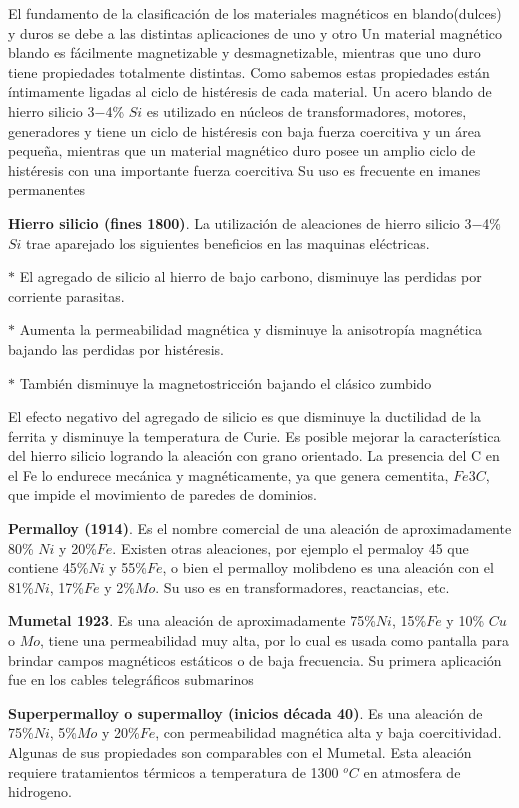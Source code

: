 El fundamento de la clasificación de los materiales magnéticos en blando(dulces) y duros se debe a las distintas aplicaciones de uno y otro Un material magnético blando es fácilmente magnetizable y desmagnetizable, mientras que uno duro tiene propiedades totalmente distintas. Como sabemos estas propiedades están íntimamente ligadas al ciclo de histéresis de cada material. Un acero blando de hierro silicio 3−4\% $Si$ es utilizado en núcleos de transformadores, motores, generadores y tiene un ciclo de histéresis con baja fuerza coercitiva y un área pequeña, mientras que un material magnético duro posee un amplio ciclo de histéresis con una importante fuerza coercitiva Su uso es frecuente en imanes permanentes

\textbf{Hierro silicio (fines 1800)}. La utilización de aleaciones de hierro silicio 3−4\% $Si$ trae aparejado los siguientes beneficios en las maquinas eléctricas.

$\ast$ El agregado de silicio al hierro de bajo carbono, disminuye las perdidas por corriente parasitas.

$\ast$ Aumenta la permeabilidad magnética y disminuye la anisotropía magnética bajando las perdidas por histéresis.

$\ast$ También disminuye la magnetostricción bajando el clásico zumbido 

El efecto negativo del agregado de silicio es que disminuye la ductilidad de la ferrita y disminuye la temperatura de Curie. Es posible mejorar la
característica del hierro silicio logrando la aleación con grano orientado. La presencia del C en el Fe lo endurece mecánica y magnéticamente, ya que
genera cementita, $Fe3C$, que impide el movimiento de paredes de dominios.

\textbf{Permalloy (1914)}. Es el nombre comercial de una aleación de aproximadamente 80\% $Ni$ y 20\%$Fe$. Existen otras aleaciones, por ejemplo el permaloy 45 que contiene 45\%$Ni$ y 55\%$Fe$, o bien el permalloy molibdeno es una aleación con el 81\%$Ni$, 17\%$Fe$ y 2\%$Mo$. Su uso es en transformadores, reactancias, etc.

\textbf{Mumetal 1923}. Es una aleación de aproximadamente 75\%$Ni$, 15\%$Fe$ y 10\% $Cu$ o $Mo$, tiene una permeabilidad muy alta, por lo cual es usada como pantalla para brindar campos magnéticos estáticos o de baja frecuencia. Su primera aplicación fue en los cables telegráficos submarinos

\textbf{Superpermalloy o supermalloy (inicios década 40)}. Es una aleación de 75\%$Ni$, 5\%$Mo$ y 20\%$Fe$, con permeabilidad magnética alta y baja
coercitividad. Algunas de sus propiedades son comparables con el Mumetal. Esta aleación requiere tratamientos térmicos a temperatura de 1300 ${^{o}C}$ en atmosfera de hidrogeno.

